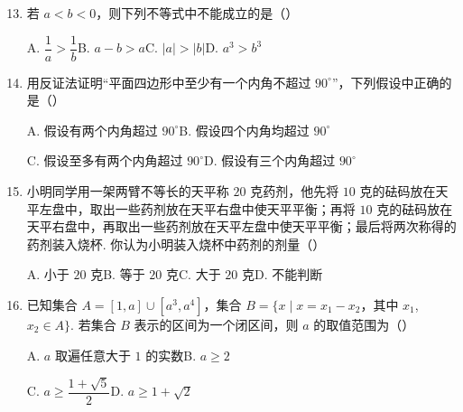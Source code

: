 \documentclass[a4paper,11pt]{article}
\begin{document}

\begin{enumerate}
\setcounter{enumi}{12}

\item 若 $a<b<0$，则下列不等式中不能成立的是\mbox{（\quad）}

\keepwithprev
A. $\dfrac1a>\dfrac1b$\qquad\qquad B. $a-b>a$\qquad\qquad C. $\lvert a\rvert>\lvert b\rvert$\qquad\qquad D. $a^3>b^3$

\ifanswer
\solbegin
{}
\solend
\fi

\item 用反证法证明“平面四边形中至少有一个内角不超过 $90^\circ$”，下列假设中正确的是\mbox{（\quad）}

\keepwithprev
A. 假设有两个内角超过 $90^\circ$\qquad B. 假设四个内角均超过 $90^\circ$

C. 假设至多有两个内角超过 $90^\circ$\qquad D. 假设有三个内角超过 $90^\circ$

\ifanswer
{}
\fi

\item 小明同学用一架两臂不等长的天平称 $20$ 克药剂，他先将 $10$ 克的砝码放在天平左盘中，取出一些药剂放在天平右盘中使天平平衡；再将 $10$ 克的砝码放在天平右盘中，再取出一些药剂放在天平左盘中使天平平衡；最后将两次称得的药剂装入烧杯. 你认为小明装入烧杯中药剂的剂量\mbox{（\quad）}

\keepwithprev
A. 小于 $20$ 克\qquad B. 等于 $20$ 克\qquad C. 大于 $20$ 克\qquad D. 不能判断

\ifanswer
\solbegin
{}
\solend
\fi

\item 已知集合 $A=[1,a]\cup[a^3,a^4]$，集合 $B=\{x\mid x=x_1-x_2$，其中 $x_1$,$x_2\in A\}$. 若集合 $B$ 表示的区间为一个闭区间，则 $a$ 的取值范围为\mbox{（\quad）}

\keepwithprev
A. $a$ 取遍任意大于 $1$ 的实数\qquad B. $a\geqslant2$

C. $a\geqslant\dfrac{1+\sqrt5}2$\qquad D. $a\geqslant1+\sqrt2$

\ifanswer
\solbegin
{}
\solend
\fi

\end{enumerate}
\end{document}
